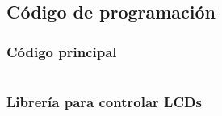 \subsection{C\'odigo de programaci\'on}
\subsubsection{C\'odigo principal}
\begin{lstlisting}

\end{lstlisting}


\subsubsection{Librer\'ia para controlar LCDs}
\begin{lstlisting}

\end{lstlisting}